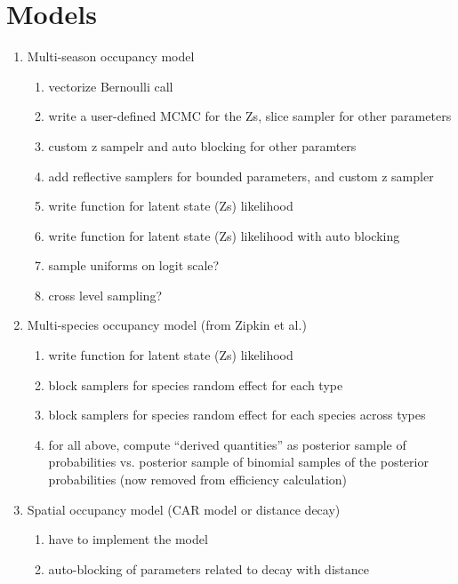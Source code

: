 \documentclass[12pt]{article}
\begin{document}
\section{Models}
\begin{enumerate}
\item Multi-season occupancy model
  \begin{enumerate}
  \item vectorize Bernoulli call \checkmark
  \item write a user-defined MCMC for the Zs, slice sampler for other
    parameters \checkmark
  \item custom z sampelr and auto blocking for other paramters
    \checkmark
  \item add reflective samplers for bounded parameters, and custom z
    sampler \checkmark
  \item write function for latent state (Zs) likelihood \checkmark
  \item write function for latent state (Zs) likelihood with auto
    blocking \checkmark
  \item sample uniforms on logit scale?
  \item cross level sampling?
  \end{enumerate}
\item Multi-species occupancy model (from Zipkin et al.)
  \begin{enumerate}
  \item write function for latent state (Zs) likelihood \checkmark
  \item block samplers for species random effect for each type \checkmark
  \item block samplers for species random effect for each species
    across types \checkmark
  \item for all above, compute ``derived quantities'' as posterior
    sample of probabilities vs. posterior sample of binomial samples
    of the posterior probabilities \checkmark (now removed from
    efficiency calculation)
  \end{enumerate}
\item Spatial occupancy model (CAR model or distance decay)
  \begin{enumerate}
  \item have to implement the model
  \item auto-blocking of parameters related to decay with distance
  \end{enumerate}
\end{enumerate}
\end{document}
